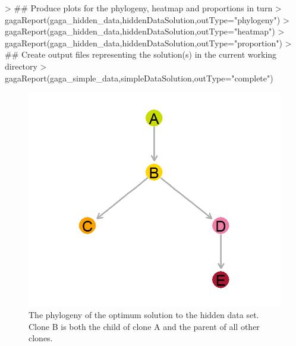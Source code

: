 \documentclass{article}
\begin{document}
\begin{Schunk}
\begin{Sinput}
> ## Produce plots for the phylogeny, heatmap and proportions in turn
> gagaReport(gaga_hidden_data,hiddenDataSolution,outType="phylogeny")
> gagaReport(gaga_hidden_data,hiddenDataSolution,outType="heatmap")
> gagaReport(gaga_hidden_data,hiddenDataSolution,outType="proportion")
> ## Create output files representing the solution(s) in the current working directory
> gagaReport(gaga_simple_data,simpleDataSolution,outType="complete")
\end{Sinput}
\end{Schunk}

\begin{figure}[H]
    \centering
    \includegraphics{gaga_hidden_data_phylogeny.png}
    \caption{The phylogeny of the optimum solution to the hidden data set.  Clone B is both the child of clone A and the parent of all other clones.}
\end{figure}
\end{document}
